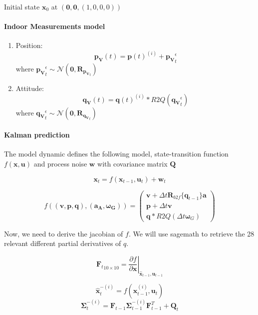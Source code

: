 \documentclass[12pt,]{article}
\let\savedparagraph\paragraph %
\let\paragraph\oldparagraph %
\let\paragraph\savedparagraph %
\providecommand{\tightlist}{%
  \setlength{\itemsep}{0pt}\setlength{\parskip}{0pt}}
\let\oldparagraph\paragraph
\renewcommand{\paragraph}[1]{\oldparagraph{#1}\mbox{}}
\begin{document}
Initial state \(\mathbf{x}_0\) at
\((\mathbf{0}, \mathbf{0}, (1, 0, 0, 0))\)

\paragraph{Indoor Measurements model}\label{indoor-measurements-model}

\begin{enumerate}
\def\labelenumi{\arabic{enumi}.}
\tightlist
\item
  Position:
  \[\mathbf{p_V}(t) = \mathbf{p}(t)^{(i)} + \mathbf{p_V}^\epsilon_t\]
  where
  \(\mathbf{p_V}^\epsilon_t \sim \mathcal{N}(\mathbf{0}, \mathbf{R}_{\mathbf{p_V}_t })\)
\item
  Attitude:
  \[\mathbf{q_V}(t) = \mathbf{q}(t)^{(i)}*R2Q(\mathbf{q_V}^\epsilon_t)\]
  where
  \(\mathbf{q_V}^\epsilon_t \sim \mathcal{N}(\mathbf{0}, \mathbf{R}_{\mathbf{q_V}_t })\)
\end{enumerate}

\paragraph{Kalman prediction}\label{kalman-prediction}

The model dynamic defines the following model, state-transition function
\(f(\mathbf{x}, \mathbf{u})\) and process noise \(\mathbf{w}\) with
covariance matrix \(\mathbf{Q}\)

\[\mathbf{x}_t = f(\mathbf{x}_{t-1}, \mathbf{u}_t) + \mathbf{w}_t\]

\[f((\mathbf{v}, \mathbf{p}, \mathbf{q}), (\mathbf{a_A}, \mathbf{\boldsymbol{\omega}_G})) = \left( \begin{array}{c}
\mathbf{v} + \Delta t \mathbf{R}_{b2f}\{\mathbf{q}_{t-1}\} \mathbf{a} \\
\mathbf{p} + \Delta t \mathbf{v} \\
\mathbf{q}*R2Q({\Delta t} \boldsymbol{\omega}_G)
\end{array} \right)\]

Now, we need to derive the jacobian of \(f\). We will use sagemath to
retrieve the 28 relevant different partial derivatives of \(q\).

\[{\mathbf{F}_t}_{10 \times 10} = \left . \frac{\partial f}{\partial \mathbf{x} } \right \vert _{\hat{\mathbf{x}}_{t-1},\mathbf{u}_{t-1}}\]

\[\hat{\mathbf{x}}^{-(i)}_t = f(\mathbf{x}^{(i)}_{t-1}, \mathbf{u}_t)\]
\[\mathbf{\Sigma}^{-(i)}_t = \mathbf{F}_{t-1} \mathbf{\Sigma}^{-(i)}_{t-1}  \mathbf{F}_{t-1}^T + \mathbf{Q}_t\]
\end{document}
